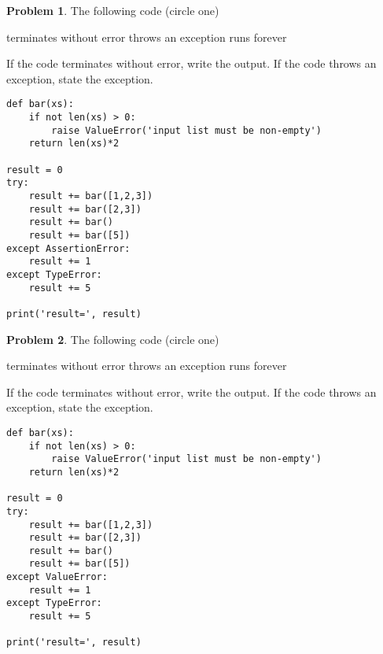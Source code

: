 \documentclass[10pt]{article}
\theoremstyle{definition}
\newtheorem{problem}{Problem}
\begin{document}
\newpage
\begin{problem}
    The following code (circle one)

    \vspace{0.25in}
    \hspace{0.5in}terminates without error 
    \hspace{1in}throws an exception
    \hspace{1in}runs forever
    \vspace{0.25in}

    \noindent
    If the code terminates without error, write the output.
    If the code throws an exception, state the exception.
\end{problem}
\begin{lstlisting}
def bar(xs):
    if not len(xs) > 0:
        raise ValueError('input list must be non-empty')
    return len(xs)*2

result = 0
try:
    result += bar([1,2,3])
    result += bar([2,3])
    result += bar()
    result += bar([5])
except AssertionError:
    result += 1
except TypeError:
    result += 5

print('result=', result)
\end{lstlisting}
\vspace{0.75in}

\begin{problem}
    The following code (circle one)

    \vspace{0.25in}
    \hspace{0.5in}terminates without error 
    \hspace{1in}throws an exception
    \hspace{1in}runs forever
    \vspace{0.25in}

    \noindent
    If the code terminates without error, write the output.
    If the code throws an exception, state the exception.
\end{problem}
\begin{lstlisting}
def bar(xs):
    if not len(xs) > 0:
        raise ValueError('input list must be non-empty')
    return len(xs)*2

result = 0
try:
    result += bar([1,2,3])
    result += bar([2,3])
    result += bar()
    result += bar([5])
except ValueError:
    result += 1
except TypeError:
    result += 5

print('result=', result)
\end{lstlisting}
\vspace{0.75in}
\end{document}
